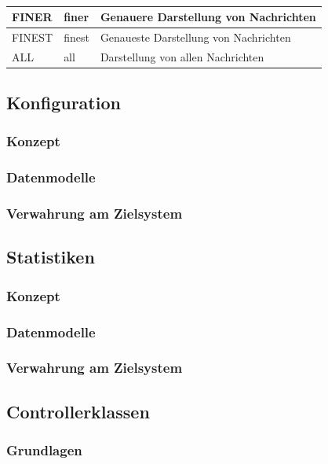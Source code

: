 \begin{table}[H]
\begin{tabular}{|l|l|l|}
FINER                 & finer                  & Genauere Darstellung von Nachrichten                                                                                 \\ \hline
FINEST                & finest                 & Genaueste Darstellung von Nachrichten                                                                                \\ \hline
ALL                   & all                    & Darstellung von allen Nachrichten                                                                                    \\ \hline
\end{tabular}
\caption{}
\end{table}
\subsection{Konfiguration}\label{subsec:konfiguration}

\subsubsection{Konzept}
\subsubsection{Datenmodelle}
\subsubsection{Verwahrung am Zielsystem}
\subsection{Statistiken}
\subsubsection{Konzept}
\subsubsection{Datenmodelle}
\subsubsection{Verwahrung am Zielsystem}
\subsection{Controllerklassen}
\subsubsection{Grundlagen}
